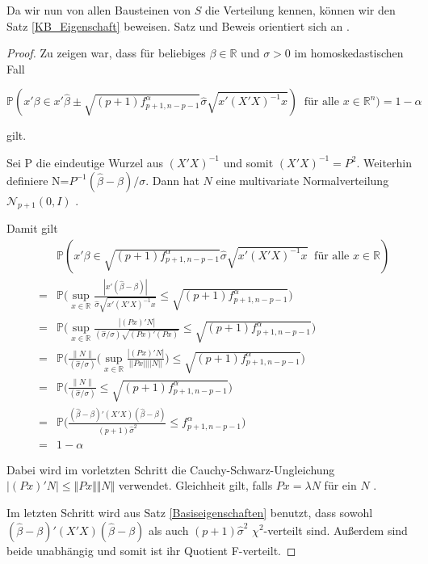 \documentclass[12pt,a4paper]{article}
\theoremstyle{definition}
\theoremstyle{definition}
\theoremstyle{definition}
\theoremstyle{definition}
\begin{document}
Da wir nun von allen Bausteinen von $S$ die Verteilung kennen, können wir den Satz \ref{KB_Eigenschaft} beweisen. Satz und Beweis orientiert sich an \cite[66]{Liu64}.

\begin{proof}
Zu zeigen war, dass für beliebiges $\beta \in \mathbb{R}$ und $\sigma > 0$  im homoskedastischen Fall

\begin{equation*}
\mathbb{P}( x'\beta \in x' \hat{\beta} \pm \sqrt{(p+1) f^{\alpha}_{p+1,n-p-1}} \hat{\sigma} \sqrt{x' (X'X)^{-1}x}) ~ \text{ für alle } x \in \mathbb{R}^{n}) = 1 - \alpha
\end{equation*}

gilt. 

Sei \gls{P} die eindeutige Wurzel aus $(X'X)^{-1}$ und somit $(X'X)^{-1} = P^2$. Weiterhin definiere \gls{N}=$P^{-1}(\hat{\beta}-\beta)/\sigma$. Dann hat $N$ eine multivariate Normalverteilung $\mathscr{N}_{p+1}(0,I)$ . 

Damit gilt
\begin{eqnarray*}
&&\mathbb{P}(x'\beta \in \sqrt{(p+1) f^{\alpha}_{p+1,n-p-1}} \hat{\sigma} \sqrt{x'(X'X)^{-1}x} ~ \text{ für alle } x \in \mathbb{R}) \\ 
&=& \mathbb{P} \big ( \sup_{x \in \mathbb{R}} \frac{|x'(\hat{\beta}-\beta)|}{\hat{\sigma} \sqrt{x'(X'X)^{-1}x}} \leq \sqrt{(p+1) f^{\alpha}_{p+1,n-p-1}} \big ) \\
&=& \mathbb{P} \big ( \sup_{x \in \mathbb{R}} \frac{|(Px)'N|}{(\hat{\sigma}/\sigma)\sqrt{(Px)'(Px)}} \leq \sqrt{(p+1) f^{\alpha}_{p+1,n-p-1}} \big ) \\
&=& \mathbb{P} \big ( \frac{\parallel N \parallel}{(\hat{\sigma}/\sigma)} \bigg ( \sup_{x \in \mathbb{R}} \frac{|(Px)'N|}{||Px|| ||N||} \bigg ) \leq \sqrt{(p+1) f^{\alpha}_{p+1,n-p-1}} \big ) \\
&=& \mathbb{P} \big (\frac{\parallel N \parallel}{(\hat{\sigma}/\sigma)} \leq \sqrt{(p+1) f^{\alpha}_{p+1,n-p-1}} \big ) \\
&=& \mathbb{P} \big (\frac{(\hat{\beta}-\beta)'(X'X)(\hat{\beta}-\beta)}{(p+1)\hat{\sigma}^2} \leq f^{\alpha}_{p+1,n-p-1} \big ) \\
&=& 1 - \alpha
\end{eqnarray*}

Dabei wird im vorletzten Schritt  die Cauchy-Schwarz-Ungleichung $ \vert (Px)'N \vert \leq \Vert Px \Vert \Vert N \Vert $ verwendet. Gleichheit gilt, falls $P x = \lambda N$ für ein $N$ . 

Im letzten Schritt wird aus Satz \ref{Basiseigenschaften} benutzt, dass sowohl $(\hat{\beta}-\beta)'(X'X)(\hat{\beta}-\beta)$ als auch $(p+1)\hat{\sigma}^2$ $\chi^2$-verteilt sind. Außerdem sind beide unabhängig und somit ist ihr Quotient F-verteilt.

\end{proof}
\end{document}
